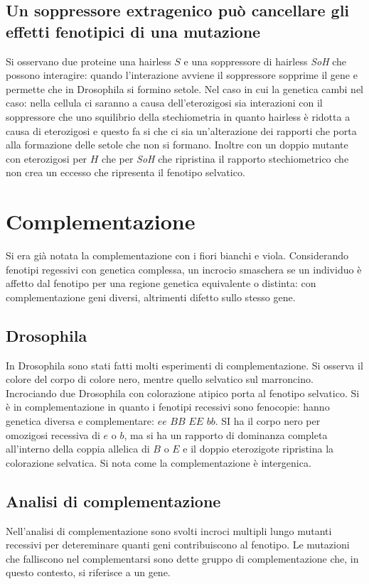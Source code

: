 \subsection{Un soppressore extragenico pu\`o cancellare gli effetti fenotipici di una mutazione}
Si osservano due proteine una hairless $S$ e una soppressore di hairless \emph{SoH} che possono interagire: quando l'interazione avviene il soppressore sopprime il gene e permette
che in Drosophila si formino setole. Nel caso in cui la genetica cambi nel caso: nella cellula ci saranno a causa dell'eterozigosi sia interazioni con il soppressore che uno 
squilibrio della stechiometria in quanto hairless \`e ridotta a causa di eterozigosi e questo fa si che ci sia un'alterazione dei rapporti che porta alla formazione delle setole che 
non si formano. Inoltre con un doppio mutante con eterozigosi per $H$ che per \emph{SoH} che ripristina il rapporto stechiometrico che non crea un eccesso che ripresenta il 
fenotipo selvatico. 
\section{Complementazione}
Si era gi\`a notata la complementazione con i fiori bianchi e viola. Considerando fenotipi regessivi con genetica complessa, un incrocio smaschera se un individuo \`e affetto dal 
fenotipo per una regione genetica equivalente o distinta: con complementazione geni diversi, altrimenti difetto sullo stesso gene.
\subsection{Drosophila}
In Drosophila sono stati fatti molti esperimenti di complementazione. Si osserva il colore del corpo di colore nero, mentre quello selvatico sul marroncino. Incrociando due 
Drosophila con colorazione atipico porta al fenotipo selvatico. Si \`e in complementazione in quanto i fenotipi recessivi sono fenocopie: hanno genetica diversa e complementare:
$ee$ $BB$ $EE$ $bb$. SI ha il corpo nero per omozigosi recessiva di $e$ o $b$, ma si ha un rapporto di dominanza completa all'interno della coppia allelica di $B$ o $E$ e il doppio 
eterozigote ripristina la colorazione selvatica. Si nota come la complementazione \`e intergenica. 
\subsection{Analisi di complementazione}
Nell'analisi di complementazione sono svolti incroci multipli lungo mutanti recessivi per detereminare quanti geni contribuiscono al fenotipo. Le mutazioni che falliscono nel 
complementarsi sono dette gruppo di complementazione che, in questo contesto, si riferisce a un gene. 
